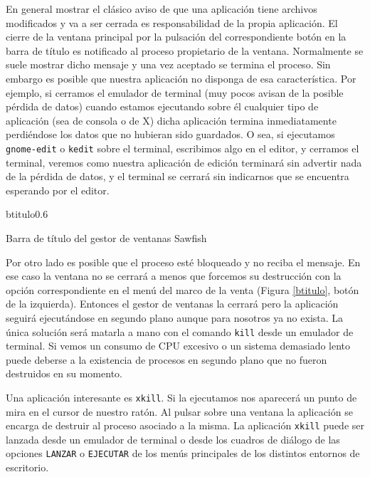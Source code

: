 En  general mostrar  el  clásico  aviso de  que  una aplicación  tiene
archivos  modificados y  va a  ser  cerrada es  responsabilidad de  la
propia aplicación. El cierre de  la ventana principal por la pulsación
del  correspondiente botón  en la  barra  de título  es notificado  al
proceso propietario de la ventana.  Normalmente se suele mostrar dicho
mensaje  y una  vez aceptado  se termina  el proceso.  Sin embargo  es
posible que nuestra aplicación no  disponga de esa característica. Por
ejemplo, si cerramos  el emulador de terminal (muy pocos  avisan de la
posible pérdida de datos) cuando estamos ejecutando sobre él cualquier
tipo de  aplicación (sea  de consola  o de  {\sf X})  dicha aplicación
termina  inmediatamente perdiéndose  los  datos que  no hubieran  sido
guardados. O sea,  si ejecutamos {\tt gnome-edit} o  {\tt kedit} sobre
el terminal,  escribimos algo  en el editor,  y cerramos  el terminal,
veremos como nuestra aplicación de edición terminará sin advertir nada
de la pérdida de datos, y el terminal se cerrará sin indicarnos que se
encuentra esperando por el editor.

\begin{figura}{btitulo}{0.6}
\caption{Barra de título del gestor de ventanas Sawfish}\label{btitulo}
\end{figura}

Por otro lado es posible que el  proceso esté bloqueado y no reciba el
mensaje. En ese caso la ventana no  se cerrará a menos que forcemos su
destrucción con la  opción correspondiente en el menú del  marco de la
venta  (Figura  \ref{btitulo}, botón  de  la  izquierda). Entonces  el
gestor de ventanas la cerrará  pero la aplicación seguirá ejecutándose
en segundo plano aunque para nosotros  ya no exista. La única solución
será matarla  a mano  con el comando  {\tt kill}  desde un
emulador de terminal. Si vemos un consumo de CPU excesivo o un sistema
demasiado lento puede  deberse a la existencia de  procesos en segundo
plano que no fueron destruidos en su momento.

Una  aplicación   interesante  es  {\tt  xkill}.   Si  la
ejecutamos nos  aparecerá un  punto de  mira en  el cursor  de nuestro
ratón.  Al  pulsar sobre  una  ventana  la  aplicación se  encarga  de
destruir al  proceso asociado  a la misma.  La aplicación  {\tt xkill}
puede ser lanzada desde un emulador de terminal o desde los cuadros de
diálogo de  las opciones {\tt  LANZAR} o  {\tt EJECUTAR} de  los menús
principales de los distintos entornos de escritorio.

